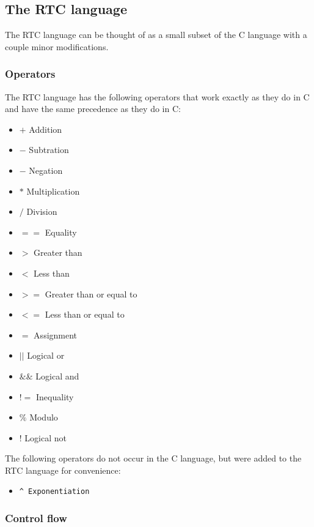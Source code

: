 
\subsection{The RTC language}

The RTC language can be thought of as a small subset of the
C language with a couple minor modifications. 

\subsubsection{Operators}

The RTC language has the following operators that work exactly as they do in C
and have the same precedence as they do in C:
\begin{itemize}
  \item $+$  Addition
  \item $-$  Subtration
  \item $-$  Negation
  \item $*$  Multiplication
  \item $/$  Division
  \item $==$ Equality
  \item $>$  Greater than
  \item $<$  Less than
  \item $>=$ Greater than or equal to
  \item $<=$ Less than or equal to
  \item $=$  Assignment
  \item $||$ Logical or
  \item $\&\&$ Logical and
  \item $!=$ Inequality
  \item $\%$ Modulo
  \item $!$  Logical not
\end{itemize}

\noindent The following operators do not occur in the C language, but were added to the RTC language for convenience:

\begin{itemize}
  \item \begin{verbatim}^ Exponentiation \end{verbatim}
\end{itemize}


\subsubsection{Control flow}

